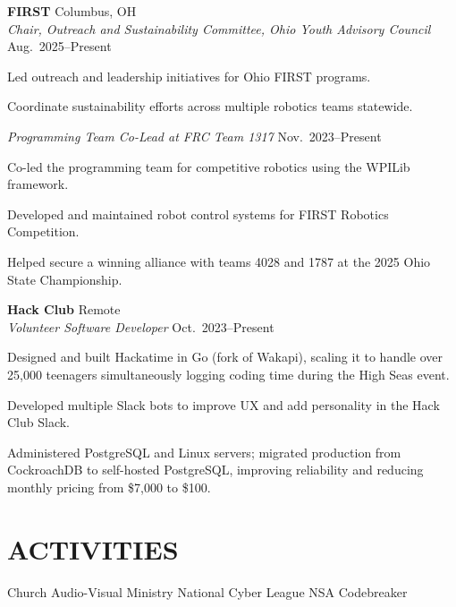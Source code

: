 \documentclass[a4paper,10pt]{article}
\makeatletter
\newlength{\mpwidth}
\newenvironment{orgblock}[2]{%
  \par\noindent
  \textbf{#1} \hfill #2\\%
}{%
  \par\vspace{6pt}%
}
\newenvironment{subxp}[2]{%
  \noindent\textit{#1} \hfill #2\\%
  \begin{minipage}[t]{\mpwidth}%
    \begingroup
      \setlength{\leftskip}{0pt}%
      \setlength{\parindent}{0pt}%
      \setlength{\parskip}{0pt}%
      \makeatletter
      \def\my@itemize{%
        \list{\labelitemi}{%
          \setlength{\leftmargin}{0.8em}%
          \setlength{\itemindent}{0pt}%
          \setlength{\labelsep}{0.6em}%
          \setlength{\labelwidth}{0pt}%
          \setlength{\parsep}{0pt}%
          \setlength{\topsep}{0pt}%
          \setlength{\partopsep}{0pt}%
          \setlength{\itemsep}{3pt}%
        }%
      }%
      \makeatother
      \renewcommand{\labelitemi}{\textendash}%
      \my@itemize
}{%
      \endlist
    \endgroup
  \end{minipage}%
  \par\vspace{2pt}%
}
\makeatother
\begin{document}
\begin{orgblock}{FIRST}{Columbus, OH}
  \begin{subxp}{Chair, Outreach and Sustainability Committee, Ohio Youth Advisory Council}{Aug.\ 2025--Present}
    \item Led outreach and leadership initiatives for Ohio FIRST programs.
    \item Coordinate sustainability efforts across multiple robotics teams statewide.
  \end{subxp}

  \begin{subxp}{Programming Team Co-Lead at FRC Team 1317}{Nov.\ 2023--Present}
    \item Co-led the programming team for competitive robotics using the WPILib framework.
    \item Developed and maintained robot control systems for FIRST Robotics Competition.
    \item Helped secure a winning alliance with teams 4028 and 1787 at the 2025 Ohio State Championship.
  \end{subxp}
\end{orgblock}

\begin{orgblock}{Hack Club}{Remote}
  \begin{subxp}{Volunteer Software Developer}{Oct.\ 2023--Present}
    \item Designed and built Hackatime in Go (fork of Wakapi), scaling it to handle over 25{,}000 teenagers simultaneously logging coding time during the High Seas event.
    \item Developed multiple Slack bots to improve UX and add personality in the Hack Club Slack.
    \item Administered PostgreSQL and Linux servers; migrated production from CockroachDB to self-hosted PostgreSQL, improving reliability and reducing monthly pricing from \$7{,}000 to \$100.
  \end{subxp}
\end{orgblock}

\section{ACTIVITIES}
\begin{center}
  {\small Church Audio-Visual Ministry \textbar{} National Cyber League \textbar{} NSA Codebreaker}
\end{center}

\vfill
\end{document}
